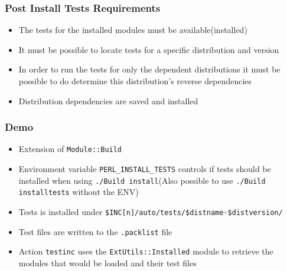 \documentclass[10pt]{beamer}
\begin{document}
\begin{frame}
\frametitle{Post Install Tests Requirements}
\begin{itemize}
\item The tests for the installed modules must be available(installed)
\item It must be possible to locate tests for a specific distribution and version
\item In order to run the tests for only the dependent distributions it must be possible to do determine this distribution's reverse dependencies
\item Distribution dependencies are saved and installed
\end{itemize}
\end{frame}

\begin{frame}[fragile]
\frametitle{Demo}

\begin{itemize}
\item Extension of \verb|Module::Build|
\item Environment variable \verb|PERL_INSTALL_TESTS| controls if tests should be installed when using  \verb|./Build install|(Also possible to use \verb|./Build installtests| without the ENV)
\item Tests is installed under \verb|$INC[n]/auto/tests/$distname-$distversion/|
\item Test files are written to the \verb|.packlist| file
\item Action \verb|testinc| uses the \verb|ExtUtils::Installed| module to retrieve the modules that would be loaded and their test files
\end{itemize}
\end{frame}
\end{document}
